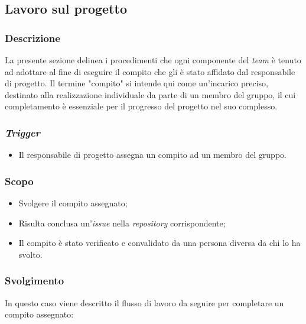 \subsection{Lavoro sul progetto}
\label{lavoro-sul-progetto}

\subsubsection{Descrizione}
La presente sezione delinea i procedimenti che ogni componente del \textit{team} è tenuto ad adottare al fine di eseguire il compito che gli è stato affidato dal responsabile di progetto.
Il termine "compito" si intende qui come un'incarico preciso, destinato alla realizzazione individuale da parte di un membro del gruppo, il cui completamento è essenziale per il progresso del progetto nel suo complesso.


\subsubsection{\textit{Trigger}}
\begin{itemize}
	\item Il responsabile di progetto assegna un compito ad un membro del
	      gruppo.
\end{itemize}

\subsubsection{Scopo}
\begin{itemize}
	\item Svolgere il compito assegnato;
	\item Risulta conclusa un'\textit{issue\g} nella \textit{repository\g}
	      corrispondente;
	\item Il compito è stato verificato e convalidato da una persona diversa
	      da chi lo ha svolto.
\end{itemize}

\subsubsection{Svolgimento}
In questo caso viene descritto il flusso di lavoro da seguire per completare
un compito assegnato:

